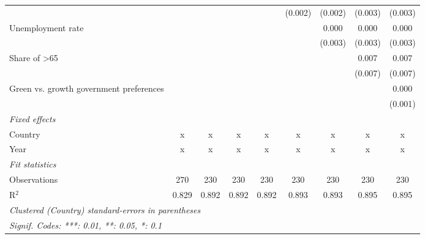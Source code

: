 \begin{table}[htbp]
\begin{tabular}{lcccccccc}
                                                                      &         &               &               &              & (0.002) & (0.002) & (0.003) & (0.003)\\   
      Unemployment rate                                               &         &               &               &              &         & 0.000   & 0.000   & 0.000\\   
                                                                      &         &               &               &              &         & (0.003) & (0.003) & (0.003)\\   
      Share of >65                                                    &         &               &               &              &         &         & 0.007   & 0.007\\   
                                                                      &         &               &               &              &         &         & (0.007) & (0.007)\\   
      Green vs. growth government preferences                         &         &               &               &              &         &         &         & 0.000\\   
                                                                      &         &               &               &              &         &         &         & (0.001)\\   
      \emph{Fixed effects}\\
      Country                                                         & x       & x             & x             & x            & x       & x       & x       & x\\  
      Year                                                            & x       & x             & x             & x            & x       & x       & x       & x\\  
      \midrule \emph{Fit statistics}\\
      Observations                                                    & 270     & 230           & 230           & 230          & 230     & 230     & 230     & 230\\  
      R$^2$                                                           & 0.829   & 0.892         & 0.892         & 0.892        & 0.893   & 0.893   & 0.895   & 0.895\\  
      \midrule
      \multicolumn{9}{l}{\emph{Clustered (Country) standard-errors in parentheses}}\\
      \multicolumn{9}{l}{\emph{Signif. Codes: ***: 0.01, **: 0.05, *: 0.1}}\\
   \end{tabular}
\end{table}


